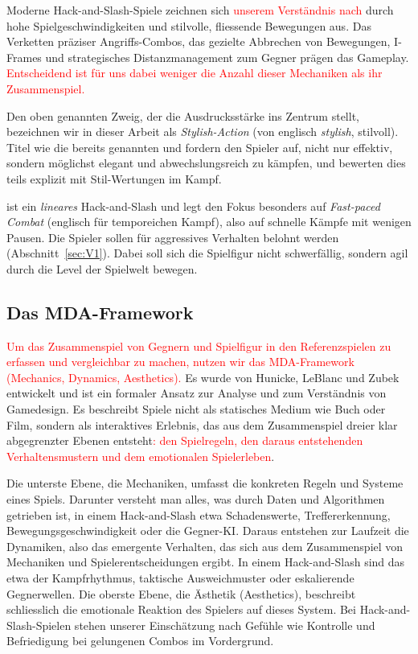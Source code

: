 \documentclass[../Main.tex]{subfiles}
\begin{document}
Moderne Hack-and-Slash-Spiele zeichnen sich \textcolor{red}{unserem Verständnis nach} durch hohe Spielgeschwindigkeiten und stilvolle, fliessende Bewegungen aus. Das Verketten präziser Angriffs-Combos, das gezielte Abbrechen von Bewegungen, I-Frames und strategisches Distanzmanagement zum Gegner prägen das Gameplay. \textcolor{red}{Entscheidend ist für uns dabei weniger die Anzahl dieser Mechaniken als ihr Zusammenspiel.}

Den oben genannten Zweig, der die Ausdrucksstärke ins Zentrum stellt, bezeichnen wir in dieser Arbeit als \textit{Stylish-Action} (von englisch \textit{stylish}, stilvoll). Titel wie die bereits genannten  und  fordern den Spieler auf, nicht nur effektiv, sondern möglichst elegant und abwechslungsreich zu kämpfen, und bewerten dies teils explizit mit Stil-Wertungen im Kampf.\autocite{capcom_devilmaycry_2001,platinumgames_bayonetta_2009}

 ist ein \textit{lineares} Hack-and-Slash und legt den Fokus besonders auf \textit{Fast-paced Combat} (englisch für temporeichen Kampf), also auf schnelle Kämpfe mit wenigen Pausen. Die Spieler sollen für aggressives Verhalten belohnt werden (Abschnitt~\ref{sec:V1}). Dabei soll sich die Spielfigur nicht schwerfällig, sondern agil durch die Level der Spielwelt bewegen.

\subsection{Das MDA-Framework} \label{sec:MDA}
\textcolor{red}{Um das Zusammenspiel von Gegnern und Spielfigur in den Referenzspielen zu erfassen und vergleichbar zu machen, nutzen wir das MDA-Framework (Mechanics, Dynamics, Aesthetics).} Es wurde von Hunicke, LeBlanc und Zubek entwickelt und ist ein formaler Ansatz zur Analyse und zum Verständnis von Gamedesign. Es beschreibt Spiele nicht als statisches Medium wie Buch oder Film, sondern als interaktives Erlebnis, das aus dem Zusammenspiel dreier klar abgegrenzter Ebenen entsteht\textcolor{red}{: den Spielregeln, den daraus entstehenden Verhaltensmustern und dem emotionalen Spielerleben}.\autocite[1--2]{hunicke2004mda}

Die unterste Ebene, die Mechaniken, umfasst die konkreten Regeln und Systeme eines Spiels. Darunter versteht man alles, was durch Daten und Algorithmen getrieben ist, in einem Hack-and-Slash etwa Schadenswerte, Treffererkennung, Bewegungsgeschwindigkeit oder die Gegner-KI. Daraus entstehen zur Laufzeit die Dynamiken, also das emergente Verhalten, das sich aus dem Zusammenspiel von Mechaniken und Spielerentscheidungen ergibt. In einem Hack-and-Slash sind das etwa der Kampfrhythmus, taktische Ausweichmuster oder eskalierende Gegnerwellen. Die oberste Ebene, die Ästhetik (Aesthetics), beschreibt schliesslich die emotionale Reaktion des Spielers auf dieses System.\autocite[2]{hunicke2004mda} Bei Hack-and-Slash-Spielen stehen unserer Einschätzung nach Gefühle wie Kontrolle und Befriedigung bei gelungenen Combos im Vordergrund.
\end{document}
